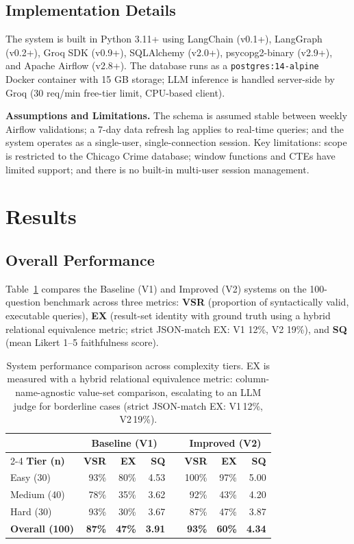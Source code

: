 \documentclass{article}
\begin{document}
\subsection{Implementation Details}

The system is built in Python 3.11+ using LangChain (v0.1+), LangGraph (v0.2+), Groq SDK (v0.9+), SQLAlchemy (v2.0+), psycopg2-binary (v2.9+), and Apache Airflow (v2.8+). The database runs as a \texttt{postgres:14-alpine} Docker container with 15 GB storage; LLM inference is handled server-side by Groq (30 req/min free-tier limit, CPU-based client).

\noindent\textbf{Assumptions and Limitations.} The schema is assumed stable between weekly Airflow validations; a 7-day data refresh lag applies to real-time queries; and the system operates as a single-user, single-connection session. Key limitations: scope is restricted to the Chicago Crime database; window functions and CTEs have limited support; and there is no built-in multi-user session management.

\section{Results}

\subsection{Overall Performance}

Table~\ref{tab:main_results} compares the Baseline (V1) and Improved (V2) systems on the 100-question benchmark across three metrics: \textbf{VSR} (proportion of syntactically valid, executable queries), \textbf{EX} (result-set identity with ground truth using a hybrid relational equivalence metric; strict JSON-match EX: V1 12\%, V2 19\%), and \textbf{SQ} (mean Likert 1--5 faithfulness score).

\begin{table}[h]
\centering
\caption{System performance comparison across complexity tiers. EX is measured with a hybrid relational equivalence metric: column-name-agnostic value-set comparison, escalating to an LLM judge for borderline cases (strict JSON-match EX: V1\,12\%, V2\,19\%).}
\label{tab:main_results}
\begin{tabular}{lrrrrrrr}
\toprule
 & \multicolumn{3}{c}{\textbf{Baseline (V1)}} & & \multicolumn{3}{c}{\textbf{Improved (V2)}} \\
\cmidrule{2-4} \cmidrule{6-8}
\textbf{Tier (n)} & \textbf{VSR} & \textbf{EX} & \textbf{SQ} & &
                    \textbf{VSR} & \textbf{EX} & \textbf{SQ} \\
\midrule
Easy   (30) & 93\% & 80\% & 4.53 & & 100\% & 97\% & 5.00 \\
Medium (40) & 78\% & 35\% & 3.62 & &  92\% & 43\% & 4.20 \\
Hard   (30) & 93\% & 30\% & 3.67 & &  87\% & 47\% & 3.87 \\
\midrule
\textbf{Overall (100)} & \textbf{87\%} & \textbf{47\%} & \textbf{3.91} & &
                        \textbf{93\%} & \textbf{60\%} & \textbf{4.34} \\
\bottomrule
\end{tabular}
\end{table}
\end{document}
